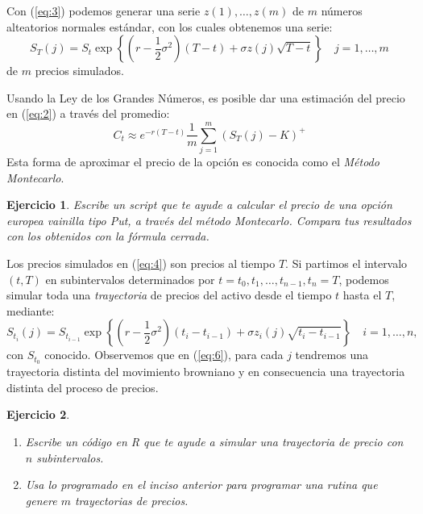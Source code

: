 \documentclass{article}
\newtheorem{ejercicio}{Ejercicio}
\begin{document}
Con (\ref{eq:3}) podemos generar una serie $z(1), \ldots, z(m)$ de $m$ números alteatorios normales estándar, con los cuales obtenemos una serie:
\begin{equation}\label{eq:4}
    S_T(j) = S_t\exp\left\{\left(r - \frac{1}{2}\sigma^2\right)(T-t)+\sigma z(j) \sqrt{T-t}\right\}\quad j = 1,\ldots, m
\end{equation}
de $m$ precios simulados.

Usando la Ley de los Grandes Números, es posible dar una estimación del precio en (\ref{eq:2}) a través del promedio:
\begin{equation}\label{eq:5} 
    C_t \approx e^{-r(T-t)}\frac{1}{m}\sum_{j=1}^m \left(S_T(j)-K\right)^+
\end{equation}
Esta forma de aproximar el precio de la opción es conocida como el \emph{Método Montecarlo}.
\begin{ejercicio}
    Escribe un script que te ayude a calcular el precio de una opción europea vainilla tipo Put, a través del método Montecarlo. Compara tus resultados con los obtenidos con la fórmula cerrada.
\end{ejercicio}
    Los precios simulados en (\ref{eq:4}) son precios al tiempo $T$. Si partimos el intervalo $(t,T)$ en subintervalos determinados por $t = t_0, t_1, \ldots, t_{n-1}, t_n = T$, podemos simular toda una \emph{trayectoria} de precios del activo desde el tiempo $t$ hasta el $T$, mediante:
    \begin{equation}\label{eq:6}
        S_{t_i}(j) = S_{t_{i-1}}\exp\left\{\left(r - \frac{1}{2}\sigma^2\right)(t_i-t_{i-1})+\sigma z_i(j) \sqrt{t_i-t_{i-1}}\right\}\quad i = 1,\ldots, n,
    \end{equation}
    con $S_{t_0}$ conocido. Observemos que en (\ref{eq:6}), para cada $j$ tendremos una trayectoria distinta del movimiento browniano y en consecuencia una trayectoria distinta del proceso de precios.
    \begin{ejercicio}
        \par\noindent
    \begin{enumerate}
        \item Escribe un código en R que te ayude a simular una trayectoria de precio con $n$ subintervalos.
        \item Usa lo programado en el inciso anterior para programar una rutina que genere $m$ trayectorias de precios.
    \end{enumerate}
\end{ejercicio}
\end{document}
